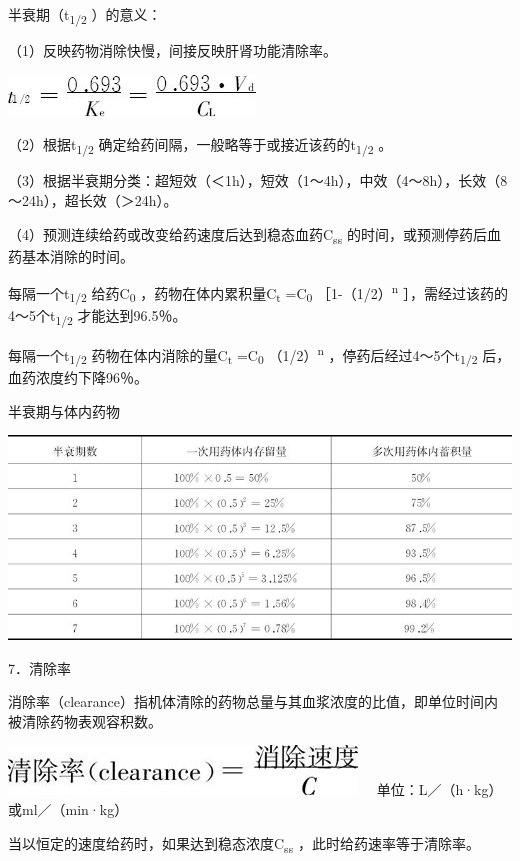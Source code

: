 半衰期（t\textsubscript{1/2} ）的意义：

（1）反映药物消除快慢，间接反映肝肾功能清除率。

\includegraphics{./images/Image00068.jpg}

（2）根据t\textsubscript{1/2}
确定给药间隔，一般略等于或接近该药的t\textsubscript{1/2} 。

（3）根据半衰期分类：超短效（＜1h），短效（1～4h），中效（4～8h），长效（8～24h），超长效（＞24h）。

（4）预测连续给药或改变给药速度后达到稳态血药C\textsubscript{ss}
的时间，或预测停药后血药基本消除的时间。

每隔一个t\textsubscript{1/2} 给药C\textsubscript{0}
，药物在体内累积量C\textsubscript{t} =C\textsubscript{0}
［1-（1/2）\textsuperscript{n}
］，需经过该药的4～5个t\textsubscript{1/2} 才能达到96.5％。

每隔一个t\textsubscript{1/2} 药物在体内消除的量C\textsubscript{t}
=C\textsubscript{0} （1/2）\textsuperscript{n}
，停药后经过4～5个t\textsubscript{1/2} 后，血药浓度约下降96％。

\begin{table}[htbp]
\centering
\caption{半衰期与体内药物}
\label{tab3-6}
\includegraphics{./images/Image00070.jpg}
\end{table}

7．清除率

消除率（clearance）指机体清除的药物总量与其血浆浓度的比值，即单位时间内被清除药物表观容积数。

\includegraphics{./images/Image00071.jpg}
　单位：L／（h·kg）或ml／（min·kg）

当以恒定的速度给药时，如果达到稳态浓度C\textsubscript{ss}
，此时给药速率等于清除率。

